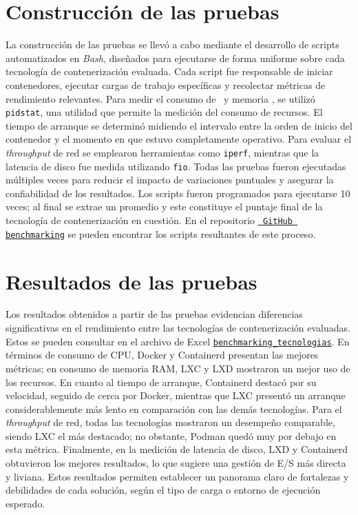 \section{Construcción de las pruebas}
\noindent
La construcción de las pruebas se llevó a cabo mediante el desarrollo de scripts automatizados en \textit{Bash}, diseñados para ejecutarse de forma uniforme sobre cada tecnología de contenerización evaluada. Cada script fue responsable de iniciar contenedores, ejecutar cargas de trabajo específicas y recolectar métricas de rendimiento relevantes.
Para medir el consumo de \CPU\ y memoria \RAM, se utilizó \texttt{pidstat}, una utilidad que permite la medición del consumo de recursos. El tiempo de arranque se determinó midiendo el intervalo entre la orden de inicio del contenedor y el momento en que estuvo completamente operativo. 
Para evaluar el \textit{throughput} de red se emplearon herramientas como \texttt{iperf}, mientras que la latencia de disco fue medida utilizando \texttt{fio}. Todas las pruebas fueron ejecutadas múltiples veces para reducir el impacto de variaciones puntuales y asegurar la confiabilidad de los resultados. Los scripts fueron programados para ejecutarse 10 veces; al final se extrae un promedio y este constituye el puntaje final de la tecnología de contenerización en cuestión.
En el repositorio \underline{\href{https://github.com/Anubis-1001/benchmark-tecnologias-de-contenerizacion} {\texttt{ GitHub benchmarking}}} se pueden encontrar los scripts resultantes de este proceso.

\section{Resultados de las pruebas}
\noindent
Los resultados obtenidos a partir de las pruebas evidencian diferencias significativas en el rendimiento entre las tecnologías de contenerización evaluadas. Estos se pueden consultar en el archivo de Excel \underline{\href{https://docs.google.com/spreadsheets/d/1Ce37Sm3Swyfa88Ur1yQbLarq_D86obUIAGGJocgQbUE/edit?usp=sharing} {\texttt{benchmarking\_tecnologias}}}.
En términos de consumo de CPU, Docker y Containerd presentan las mejores métricas; en consumo de memoria RAM, LXC y LXD mostraron un mejor uso de los recursos. En cuanto al tiempo de arranque, Containerd destacó por su velocidad, seguido de cerca por Docker, mientras que LXC presentó un arranque considerablemente más lento en comparación con las demás tecnologías.
Para el \textit{throughput} de red, todas las tecnologías mostraron un desempeño comparable, siendo LXC el más destacado; no obstante, Podman quedó muy por debajo en esta métrica. Finalmente, en la medición de latencia de disco, LXD y Containerd obtuvieron los mejores resultados, lo que sugiere una gestión de E/S más directa y liviana.
Estos resultados permiten establecer un panorama claro de fortalezas y debilidades de cada solución, según el tipo de carga o entorno de ejecución esperado.

